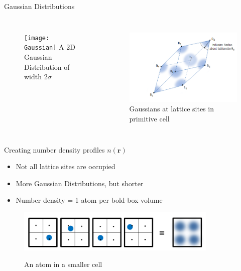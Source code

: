 \documentclass{beamer}
\renewcommand{\vec}[1]{\mathbf{#1}}
\begin{document}
\begin{frame}{Gaussian Distributions}
	\begin{columns}[t]
        \begin{figure}
            \centering
            \texttt{[image: Gaussian]}
            A 2D Gaussian Distribution of width 2$\sigma$
          \end{figure}
		 \begin{figure}
            \centering
            \includegraphics[width=1.02\columnwidth]{InclusionRadius.png}
            Gaussians at lattice sites in primitive cell
          \end{figure}
	\end{columns}	

	
\end{frame}





\begin{frame}{Creating number density profiles $n(\vec r)$}
    \begin{itemize}
	    \item Not all lattice sites are occupied
		\item More Gaussian Distributions, but shorter
		\item Number density = 1 atom per bold-box volume
	\end{itemize}	

    \begin{figure}
       \centering
       \includegraphics[height=2cm]{Ensemble_Smallcells.png}
       \label{fig:Ensemble_Smallcells}
       
       An atom in a smaller cell
    \end{figure}     
\end{frame}
\end{document}
